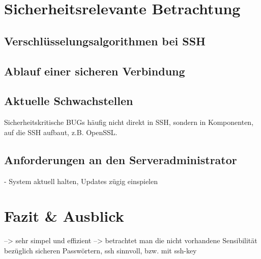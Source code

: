 \documentclass[ngerman,pdf]{wkcms}    %
\begin{document}
\section{Sicherheitsrelevante Betrachtung}




\subsection{Verschlüsselungsalgorithmen bei SSH}
\subsection{Ablauf einer sicheren Verbindung}\label{sec:ablauf}
\subsection{Aktuelle Schwachstellen}
Sicherheitskritische BUGs häufig nicht direkt in SSH, sondern in Komponenten, auf die SSH aufbaut, z.B. OpenSSL.

\subsection{Anforderungen an den Serveradministrator}
- System aktuell halten, Updates zügig einspielen


\newpage


\section{Fazit \& Ausblick}
--> sehr simpel und effizient
--> betrachtet man die nicht vorhandene Sensibilität bezüglich sicheren Passwörtern, ssh sinnvoll, bzw. mit ssh-key




\end{document}
